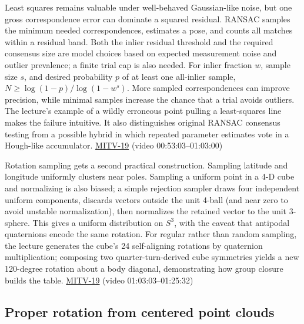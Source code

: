 Least squares remains valuable under well-behaved Gaussian-like noise, but one gross correspondence error can dominate a squared residual. RANSAC samples the minimum needed correspondences, estimates a pose, and counts all matches within a residual band. Both the inlier residual threshold and the required consensus size are model choices based on expected measurement noise and outlier prevalence; a finite trial cap is also needed. For inlier fraction \(w\), sample size \(s\), and desired probability \(p\) of at least one all-inlier sample, \(N\ge\log(1-p)/\log(1-w^s)\). More sampled correspondences can improve precision, while minimal samples increase the chance that a trial avoids outliers. The lecture's example of a wildly erroneous point pulling a least-squares line makes the failure intuitive. It also distinguishes original RANSAC consensus testing from a possible hybrid in which repeated parameter estimates vote in a Hough-like accumulator. \hyperref[04-visual-computing-ii-ch036-mitv-19---absolute-orientation-in-closed-form-outliers-and-robustness-ransac]{MITV-19} (video 00:53:03--01:03:00)

Rotation sampling gets a second practical construction. Sampling latitude and longitude uniformly clusters near poles. Sampling a uniform point in a 4-D cube and normalizing is also biased; a simple rejection sampler draws four independent uniform components, discards vectors outside the unit 4-ball (and near zero to avoid unstable normalization), then normalizes the retained vector to the unit 3-sphere. This gives a uniform distribution on \(S^3\), with the caveat that antipodal quaternions encode the same rotation. For regular rather than random sampling, the lecture generates the cube's 24 self-aligning rotations by quaternion multiplication; composing two quarter-turn-derived cube symmetries yields a new 120-degree rotation about a body diagonal, demonstrating how group closure builds the table. \hyperref[04-visual-computing-ii-ch036-mitv-19---absolute-orientation-in-closed-form-outliers-and-robustness-ransac]{MITV-19} (video 01:03:03--01:25:32)

\subsection{Proper rotation from centered point clouds}\label{04-visual-computing-ii-ch032-proper-rotation-from-centered-point-clouds}

\hypertarget{04-visual-computing-ii-ch032-proper-rotation-from-centered-point-clouds}{}

